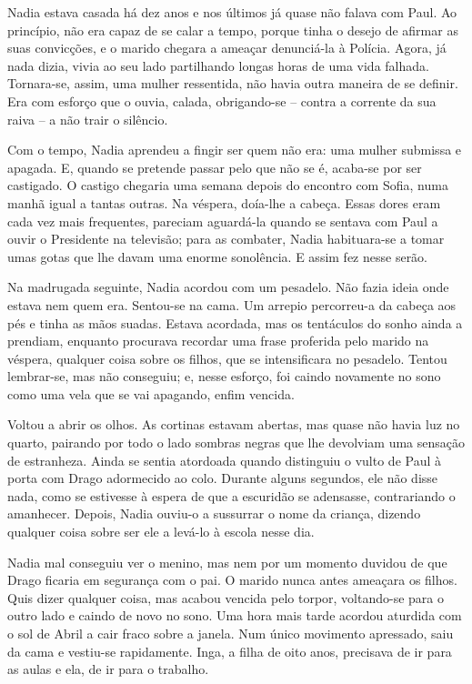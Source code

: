 Nadia estava casada há dez anos e nos últimos já quase não falava com
Paul. Ao princípio, não era capaz de se calar a tempo, porque tinha o
desejo de afirmar as suas convicções, e o marido chegara a ameaçar
denunciá-la à Polícia. Agora, já nada dizia, vivia ao seu lado partilhando longas horas de uma vida falhada. Tornara-se, assim, uma mulher
ressentida, não havia outra maneira de se definir. Era com esforço que o
ouvia, calada, obrigando-se -- contra a corrente da sua raiva -- a não
trair o silêncio.

Com o tempo, Nadia aprendeu a fingir ser quem não era: uma mulher
submissa e apagada. E, quando se pretende passar pelo que não se é,
acaba-se por ser castigado. O castigo chegaria uma semana depois do
encontro com Sofia, numa manhã igual a tantas outras. Na véspera,
doía-lhe a cabeça. Essas dores eram cada vez mais frequentes, pareciam
aguardá-la quando se sentava com Paul a ouvir o Presidente na televisão;
para as combater, Nadia habituara-se a tomar umas gotas que lhe davam
uma enorme sonolência. E assim fez nesse serão.

Na madrugada seguinte, Nadia acordou com um pesadelo. Não fazia ideia
onde estava nem quem era. Sentou-se na cama. Um arrepio percorreu-a da
cabeça aos pés e tinha as mãos suadas. Estava acordada, mas os
tentáculos do sonho ainda a prendiam, enquanto procurava recordar uma
frase proferida pelo marido na véspera, qualquer coisa sobre os filhos,
que se intensificara no pesadelo. Tentou lembrar-se, mas não conseguiu;
e, nesse esforço, foi caindo novamente no sono como uma vela que se vai
apagando, enfim vencida.

Voltou a abrir os olhos. As cortinas estavam abertas, mas quase não
havia luz no quarto, pairando por todo o lado sombras negras que lhe
devolviam uma sensação de estranheza. Ainda se sentia atordoada quando
distinguiu o vulto de Paul à porta com Drago adormecido ao colo. Durante
alguns segundos, ele não disse nada, como se estivesse à espera de que a
escuridão se adensasse, contrariando o amanhecer. Depois, Nadia
ouviu-o a sussurrar o nome da criança, dizendo qualquer coisa sobre ser
ele a levá-lo à escola nesse dia.

Nadia mal conseguiu ver o menino, mas nem por um momento duvidou de que
Drago ficaria em segurança com o pai. O marido nunca antes ameaçara os
filhos. Quis dizer qualquer coisa, mas acabou vencida pelo torpor,
voltando-se para o outro lado e caindo de novo no sono. Uma hora mais
tarde acordou aturdida com o sol de Abril a cair fraco sobre a janela.
Num único movimento apressado, saiu da cama e vestiu-se rapidamente.
Inga, a filha de oito anos, precisava de ir para as aulas e ela, de ir
para o trabalho.

